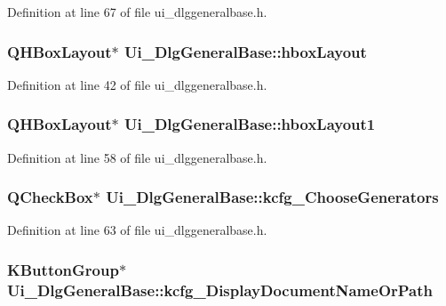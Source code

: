 Definition at line 67 of file ui\+\_\+dlggeneralbase.\+h.

\hypertarget{classUi__DlgGeneralBase_a43bdd775726703c8af00b360880cd7a9}{
\subsubsection[{hbox\+Layout}]{\setlength{\rightskip}{0pt plus 5cm}Q\+H\+Box\+Layout$\ast$ Ui\+\_\+\+Dlg\+General\+Base\+::hbox\+Layout}}\label{classUi__DlgGeneralBase_a43bdd775726703c8af00b360880cd7a9}


Definition at line 42 of file ui\+\_\+dlggeneralbase.\+h.

\hypertarget{classUi__DlgGeneralBase_a2db865b00918e93123eb63bf71b083d2}{
\subsubsection[{hbox\+Layout1}]{\setlength{\rightskip}{0pt plus 5cm}Q\+H\+Box\+Layout$\ast$ Ui\+\_\+\+Dlg\+General\+Base\+::hbox\+Layout1}}\label{classUi__DlgGeneralBase_a2db865b00918e93123eb63bf71b083d2}


Definition at line 58 of file ui\+\_\+dlggeneralbase.\+h.

\hypertarget{classUi__DlgGeneralBase_ad63d50a9664ae9d855e43ac1a95e3629}{
\subsubsection[{kcfg\+\_\+\+Choose\+Generators}]{\setlength{\rightskip}{0pt plus 5cm}Q\+Check\+Box$\ast$ Ui\+\_\+\+Dlg\+General\+Base\+::kcfg\+\_\+\+Choose\+Generators}}\label{classUi__DlgGeneralBase_ad63d50a9664ae9d855e43ac1a95e3629}


Definition at line 63 of file ui\+\_\+dlggeneralbase.\+h.

\hypertarget{classUi__DlgGeneralBase_a1e6d624833130b412bc2bea8a1861025}{
\subsubsection[{kcfg\+\_\+\+Display\+Document\+Name\+Or\+Path}]{\setlength{\rightskip}{0pt plus 5cm}K\+Button\+Group$\ast$ Ui\+\_\+\+Dlg\+General\+Base\+::kcfg\+\_\+\+Display\+Document\+Name\+Or\+Path}}\label{classUi__DlgGeneralBase_a1e6d624833130b412bc2bea8a1861025}


